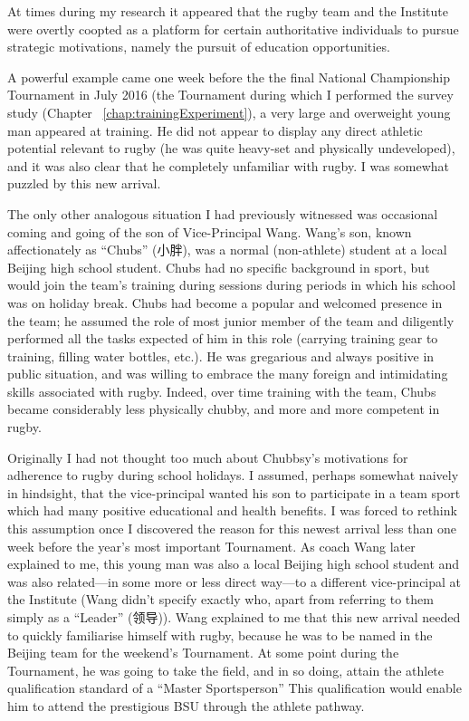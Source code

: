 \begin{CJK}{UTF8}{gbsn}

At times during my research it appeared that the rugby team and the Institute were overtly coopted as a platform for certain authoritative individuals to pursue strategic motivations, namely the pursuit of education opportunities.

A powerful example came one week before the the final National Championship Tournament in July 2016 (the Tournament during which I performed the survey study (Chapter ~\ref{chap:trainingExperiment}), a very large and overweight young man appeared at training.  He did not appear to display any direct athletic potential relevant to rugby (he was quite heavy-set and physically undeveloped), and it was also clear that he completely unfamiliar with rugby.  I was somewhat puzzled by this new arrival.

The only other analogous situation I had previously witnessed was occasional coming and going of the son of Vice-Principal Wang. Wang's son, known affectionately as ``Chubs'' (小胖), was a normal (non-athlete) student at a local Beijing high school student.  Chubs had no specific background in sport, but would join the team's training during sessions during periods in which his school was on holiday break.  Chubs had become a popular and welcomed presence in the team; he assumed the role of most junior member of the team and diligently performed all the tasks expected of him in this role (carrying training gear to training, filling water bottles, etc.). He was gregarious and always positive in public situation, and was willing to embrace the many foreign and intimidating skills associated with rugby. Indeed, over time training with the team, Chubs became considerably less physically chubby, and more and more competent in rugby.

Originally I had not thought too much about Chubbsy's motivations for adherence to rugby during school holidays.  I assumed, perhaps somewhat naively in hindsight, that the vice-principal wanted his son to participate in a team sport which had many positive educational and health benefits.  I was forced to rethink this assumption once I discovered the reason for this newest arrival less than one week before the year's most important Tournament.  As coach Wang later explained to me, this young man was also a local Beijing high school student and was also related---in some more or less direct way---to a different vice-principal at the Institute (Wang didn't specify exactly who, apart from referring to them simply as a ``Leader'' (领导)).  Wang explained to me that this new arrival needed to quickly familiarise himself with rugby, because he was to be named in the Beijing team for the weekend's Tournament.  At some point during the Tournament, he was going to take the field, and in so doing, attain the athlete qualification standard of a ``Master Sportsperson''  This qualification would enable him to attend the prestigious BSU through the athlete pathway.


\end{CJK}
